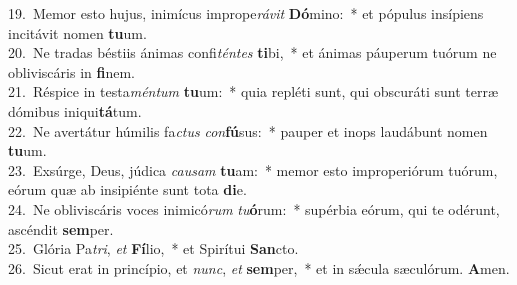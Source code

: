 {19.~}Memor esto hujus, inimícus imprope\textit{rá}\textit{vit} \textbf{Dó}mino:~* et pópulus insípiens incitávit nomen \textbf{tu}um.\\
{20.~}Ne tradas béstiis ánimas confi\textit{tén}\textit{tes} \textbf{ti}bi,~* et ánimas páuperum tuórum ne obliviscáris in \textbf{fi}nem.\\
{21.~}Réspice in testa\textit{mén}\textit{tum} \textbf{tu}um:~* quia repléti sunt, qui obscuráti sunt terræ dómibus iniqui\textbf{tá}tum.\\
{22.~}Ne avertátur húmilis fa\textit{ctus} \textit{con}\textbf{fú}sus:~* pauper et inops laudábunt nomen \textbf{tu}um.\\
{23.~}Exsúrge, Deus, júdica \textit{cau}\textit{sam} \textbf{tu}am:~* memor esto improperiórum tuórum, eórum quæ ab insipiénte sunt tota \textbf{di}e.\\
{24.~}Ne obliviscáris voces inimicó\textit{rum} \textit{tu}\textbf{ó}rum:~* supérbia eórum, qui te odérunt, ascéndit \textbf{sem}per.\\
{25.~}Glória Pa\textit{tri}, \textit{et} \textbf{Fí}lio,~* et Spirítui \textbf{San}cto.\\
{26.~}Sicut erat in princípio, et \textit{nunc}, \textit{et} \textbf{sem}per,~* et in sǽcula sæculórum. \textbf{A}men.\\
